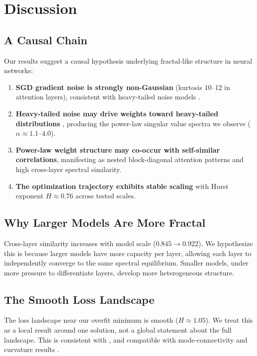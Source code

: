 \documentclass[11pt,a4paper]{article}
\begin{document}
\section{Discussion}

\subsection{A Causal Chain}

Our results suggest a causal hypothesis underlying fractal-like structure in neural networks:

\begin{enumerate}[leftmargin=*]
    \item \textbf{SGD gradient noise is strongly non-Gaussian} (kurtosis 10--12 in attention layers), consistent with heavy-tailed noise models \citep{simsekli2019tail}.
    \item \textbf{Heavy-tailed noise may drive weights toward heavy-tailed distributions} \citep{hodgkinson2021multiplicative}, producing the power-law singular value spectra we observe ($\alpha \approx 1.1$--$4.0$).
    \item \textbf{Power-law weight structure may co-occur with self-similar correlations}, manifesting as nested block-diagonal attention patterns and high cross-layer spectral similarity.
    \item \textbf{The optimization trajectory exhibits stable scaling} with Hurst exponent $H \approx 0.76$ across tested scales.
\end{enumerate}

\subsection{Why Larger Models Are More Fractal}

Cross-layer similarity increases with model scale ($0.845 \to 0.922$). We hypothesize this is because larger models have more capacity per layer, allowing each layer to independently converge to the same spectral equilibrium. Smaller models, under more pressure to differentiate layers, develop more heterogeneous structure.

\subsection{The Smooth Loss Landscape}

The loss landscape near our overfit minimum is smooth ($H \approx 1.05$). We treat this as a local result around one solution, not a global statement about the full landscape. This is consistent with \citet{li2018visualizing}, and compatible with mode-connectivity and curvature results \citep{garipov2018modeconnectivity, ghorbani2019hessian}.
\end{document}
